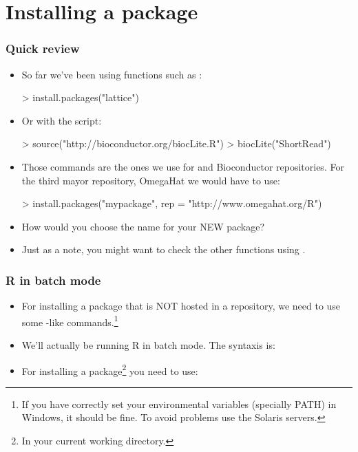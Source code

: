\section{Installing a package}

\begin{frame}
  \frametitle{Quick review}
  \begin{itemize}
  \item So far we've been using functions such as :
\begin{Schunk}
\begin{Sinput}
> install.packages("lattice")
\end{Sinput}
\end{Schunk}
  \item Or with the  script:
\begin{Schunk}
\begin{Sinput}
> source("http://bioconductor.org/biocLite.R")
> biocLite("ShortRead")
\end{Sinput}
\end{Schunk}
  \item Those commands are the ones we use for  and Bioconductor repositories. For the third mayor repository, OmegaHat we would have to use: \scriptsize
\begin{Schunk}
\begin{Sinput}
> install.packages("mypackage", rep = "http://www.omegahat.org/R")
\end{Sinput}
\end{Schunk}
  \item \normalsize How would you choose the name for your \alert{NEW} package?
  \item Just as a note, you might want to check the other  functions using .
  \end{itemize}
\end{frame}

\begin{frame}[allowframebreaks]
  \frametitle{R in batch mode}
  \begin{itemize}
  \item For installing a package that is NOT hosted in a repository, we need to use some -like commands.\footnote{If you have correctly set your environmental variables (specially PATH) in Windows, it should be fine. To avoid problems use the Solaris servers.}
  \item We'll actually be running R in batch mode. The  syntaxis is: \\ 
  \item For installing a package\footnote{In your current working directory.} you need to use: \\ 
  \end{itemize}
\end{frame}

